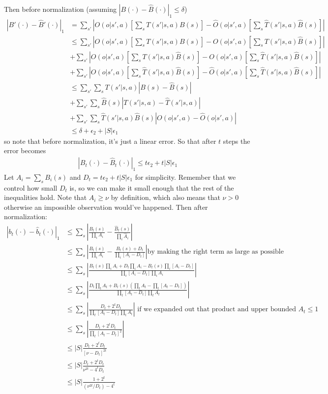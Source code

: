 \documentclass[10pt,english]{article}
\begin{document}
Then before normalization (assuming $|B(\cdot) - \widehat{B}(\cdot)|_1 \leq \delta$)
\begin{align}
|B'(\cdot) - \widehat{B}'(\cdot)|_1 &= \sum_{s'}\left|O(o|s',a)\left[\sum_s T(s'|s,a)B(s)\right]-\widehat{O}(o|s',a)\left[\sum_s \widehat{T}(s'|s,a)\widehat{B}(s)\right]\right|\\
&\leq \sum_{s'}\left|O(o|s',a)\left[\sum_s T(s'|s,a)B(s)\right]-O(o|s',a)\left[\sum_s T(s'|s,a)\widehat{B}(s)\right]\right|\\
&+ \sum_{s'}\left|O(o|s',a)\left[\sum_s T(s'|s,a)\widehat{B}(s)\right]-O(o|s',a)\left[\sum_s \widehat{T}(s'|s,a)\widehat{B}(s)\right]\right|\\
&+ \sum_{s'}\left|O(o|s',a)\left[\sum_s \widehat{T}(s'|s,a)\widehat{B}(s)\right]-\widehat{O}(o|s',a)\left[\sum_s \widehat{T}(s'|s,a)\widehat{B}(s)\right]\right|\\
&\leq \sum_{s'}\sum_s T(s'|s,a)\left|B(s)-\widehat{B}(s)\right| \\
&+ \sum_{s'}\sum_s \widehat{B}(s)\left|T(s'|s,a)-\widehat{T}(s'|s,a)\right| \\
&+ \sum_{s'}\sum_s \widehat{T}(s'|s,a)\widehat{B}(s)\left|O(o|s',a)-\widehat{O}(o|s',a)\right| \\
&\leq \delta + \epsilon_2 + |S|\epsilon_1
\end{align}
so note that before normalization, it's just a linear error. So that after $t$ steps the error becomes
\begin{align}
|B_t(\cdot) - \widehat{B}_t(\cdot)|_1 \leq t\epsilon_2 + t|S|\epsilon_1
\end{align}
Let $A_i=\sum_s B_i(s)$ and $D_t = t\epsilon_2 + t|S|\epsilon_1$ for simplicity. Remember that we control how small $D_t$ is, so we can make it small enough that the rest of the inequalities hold. Note that $A_i\geq \nu$ by definition, which also means that $\nu > 0$ otherwise an impossible observation would've happened. Then after normalization:
\begin{align}
|b_t(\cdot)-\widehat{b}_t(\cdot)|_1 &\leq \sum_s \left| \frac{B_t(s)}{\prod_i A_i} - \frac{\widehat{B}_t(s)}{\prod_i \widehat{A}_i} \right| \\
&\leq \sum_s \left| \frac{B_t(s)}{\prod_i A_i} - \frac{B_t(s)+D_t}{\prod_i [A_i-D_t]} \right| \text{by making the right term as large as possible} \\
&\leq \sum_s \left| \frac{B_t(s)\prod_i A_i+D_t\prod_i A_i - B_t(s)\prod_i [A_i-D_t]}{\prod_i [A_i-D_t]\prod_i A_i} \right| \\
&\leq \sum_s \left| \frac{D_t\prod_t A_t +B_t(s)(\prod_t A_t-\prod_t [A_t-D_t])}{\prod_t [A_t-D_t]\prod_t A_t} \right| \\
&\leq \sum_s \left| \frac{D_t +2^tD_t}{\prod_t [A_t-D_t]\prod_t A_t} \right| \text{ if we expanded out that product and upper bounded $A_t\leq 1$ } \\
&\leq \sum_s \left| \frac{D_t +2^tD_t}{\prod_t [A_t-D_t]^2} \right|\\
&\leq |S|\frac{D_t +2^tD_t}{[\nu-D_t]^{2t}} \\
&\leq |S|\frac{D_t +2^tD_t}{\nu^{2t}-4^tD_t} \\
&\leq |S|\frac{1 +2^t}{(\nu^{2t}/D_t)-4^t}
\end{align}
\end{document}
